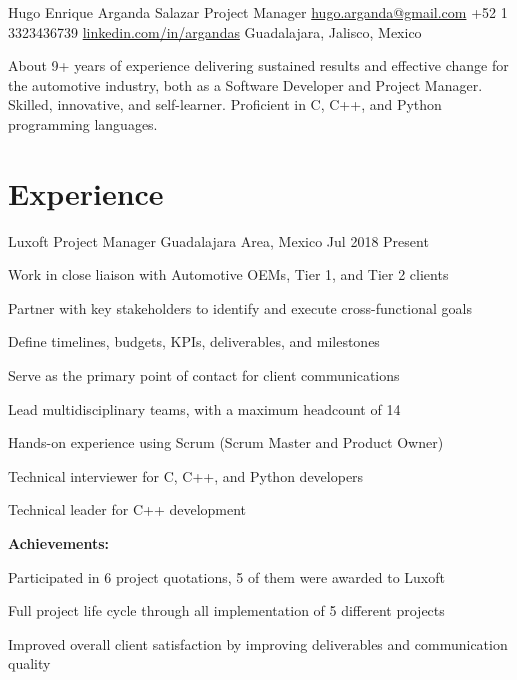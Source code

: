 \documentclass[10pt, letterpaper]{article} %
\begin{document}

\customheader
{Hugo Enrique Arganda Salazar}
{Project Manager}
{\href{mailto:hugo.arganda@gmail.com}{hugo.arganda@gmail.com}}
{+52 1 3323436739}
{\href{https://www.linkedin.com/in/argandas}{linkedin.com/in/argandas}}
{Guadalajara, Jalisco, Mexico}





\summary
{About}
{9+ years of experience delivering sustained results and effective change for the automotive industry, both as a Software Developer and Project Manager. Skilled, innovative, and self-learner. Proficient in C, C++, and Python programming languages.
}


\section{Experience}

\job
{Luxoft}
{Project Manager}
{Guadalajara Area, Mexico}
{Jul 2018}
{Present}
{
\begin{itemize-bullets}
\item{Work in close liaison with Automotive OEMs, Tier 1, and Tier 2 clients}
\item{Partner with key stakeholders to identify and execute cross-functional goals}
\item{Define timelines, budgets, KPIs, deliverables, and milestones}
\item{Serve as the primary point of contact for client communications}
\item{Lead multidisciplinary teams, with a maximum headcount of 14}
\item{Hands-on experience using Scrum (Scrum Master and Product Owner)}
\item{Technical interviewer for C, C++, and Python developers}
\item{Technical leader for C++ development}
\end{itemize-bullets}
\textbf{Achievements:}
\begin{itemize-bullets}
\item{Participated in 6 project quotations, 5 of them were awarded to Luxoft}
\item{Full project life cycle through all implementation of 5 different projects}
\item{Improved overall client satisfaction by improving deliverables and communication quality}
\end{itemize-bullets}
}
\end{document}
